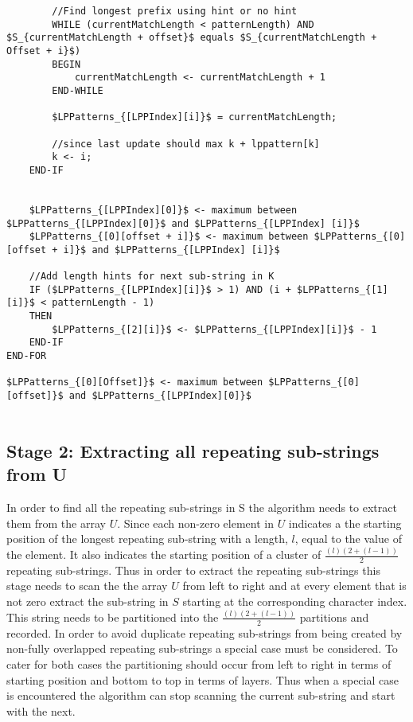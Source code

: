 \documentclass[12pt]{article}
\begin{document}
\begin{flushleft}
\begin{lstlisting}
		//Find longest prefix using hint or no hint
		WHILE (currentMatchLength < patternLength) AND $S_{currentMatchLength + offset}$ equals $S_{currentMatchLength + Offset + i}$)
		BEGIN
			currentMatchLength <- currentMatchLength + 1
		END-WHILE
		
		$LPPatterns_{[LPPIndex][i]}$ = currentMatchLength;
		
		//since last update should max k + lppattern[k]
		k <- i;
	END-IF
	

	$LPPatterns_{[LPPIndex][0]}$ <- maximum between $LPPatterns_{[LPPIndex][0]}$ and $LPPatterns_{[LPPIndex] [i]}$
	$LPPatterns_{[0][offset + i]}$ <- maximum between $LPPatterns_{[0][offset + i]}$ and $LPPatterns_{[LPPIndex] [i]}$
	
	//Add length hints for next sub-string in K
	IF ($LPPatterns_{[LPPIndex][i]}$ > 1) AND (i + $LPPatterns_{[1][i]}$ < patternLength - 1)
	THEN
		$LPPatterns_{[2][i]}$ <- $LPPatterns_{[LPPIndex][i]}$ - 1
	END-IF
END-FOR

$LPPatterns_{[0][Offset]}$ <- maximum between $LPPatterns_{[0][offset]}$ and $LPPatterns_{[LPPIndex][0]}$


\end{lstlisting}
	\newpage	
	\subsection{Stage 2: Extracting all repeating sub-strings from U}
		
	In order to find all the repeating sub-strings in S the algorithm needs to extract them from the array $U$. Since each non-zero element in $U$ indicates a the starting position of the longest repeating sub-string with a length, $l$, equal to the value of the element. It also indicates the starting position of a cluster of $\frac{(l)(2 + (l-1))}{2}$ repeating sub-strings. Thus in order to extract the repeating sub-strings this stage needs to scan the the array $U$ from left to right and at every element that is not zero extract the sub-string in $S$ starting at the corresponding character index. This string needs to be partitioned into the $\frac{(l)(2 + (l-1))}{2}$ partitions and recorded. In order to avoid duplicate repeating sub-strings from being created by non-fully overlapped repeating sub-strings a special case must be considered. To cater for both cases the partitioning should occur from left to right in terms of starting position and bottom to top in terms of layers. Thus when a special case is encountered the algorithm can stop scanning the current sub-string and start with the next.
	\newpage

\end{flushleft}
\end{document}

